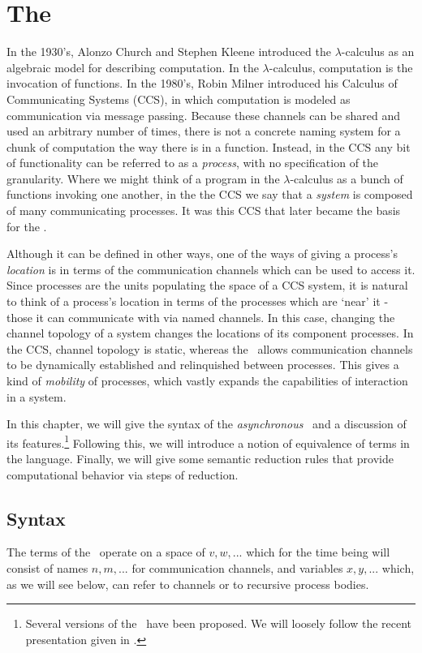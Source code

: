 
\chapter{The \Picalc}\label{the picalc}
	In the 1930's, Alonzo Church and Stephen Kleene introduced the $\lambda$-calculus as an algebraic model for describing computation.  In the $\lambda$-calculus, computation is the invocation of functions.  In the 1980's, Robin Milner introduced his Calculus of Communicating Systems (CCS), in which computation is modeled as communication via message passing.  Because these channels can be shared and used an arbitrary number of times, there is not a concrete naming system for a chunk of computation the way there is in a function.  Instead, in the CCS any bit of functionality can be referred to as a \emph{process}, with no specification of the granularity.  Where we might think of a program in the $\lambda$-calculus as a bunch of functions invoking one another, in the the CCS we say that a \emph{system} is composed of many communicating processes.  It was this CCS that later became the basis for the \picalc.  
	
Although it can be defined in other ways, one of the ways of giving a process's \emph{location} is in terms of the communication channels which can be used to access it.  Since processes are the units populating the space of a CCS system, it is natural to think of a process's location in terms of the processes which are `near' it - those it can communicate with via named channels.  In this case, changing the channel topology of a system changes the locations of its component processes.  In the CCS, channel topology is static, whereas the \picalc\ allows communication channels to be dynamically established and relinquished between processes.  This gives a kind of \emph{mobility} of processes, which vastly expands the capabilities of interaction in a system.
	
	In this chapter, we will give the syntax of the \emph{asynchronous} \picalc\ and a discussion of its features.\footnote{Several versions of the \picalc\ have been proposed.  We will loosely follow the recent presentation given in \cite{henn07}.}  Following this, we will introduce a notion of equivalence of terms in the language.  Finally, we will give some semantic reduction rules that provide computational behavior via steps of reduction.
	\section{Syntax}\label{spisyntax}
	The terms of the \picalc\ operate on a space of  $v,w,...$ which for the time being will consist of names $n,m,...$ for communication channels, and variables $x,y,...$ which, as we will see below, can refer to channels or to recursive process bodies.
	
